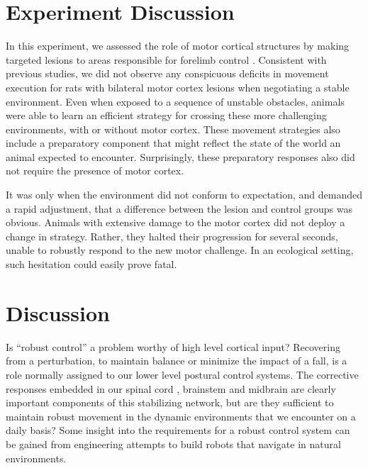 \section{Experiment Discussion}

In this experiment, we assessed the role of motor cortical structures by making targeted lesions to areas responsible for forelimb control \cite{Kawai2015,Otchy2015}. Consistent with previous studies, we did not observe any conspicuous deficits in movement execution for rats with bilateral motor cortex lesions when negotiating a stable environment. Even when exposed to a sequence of unstable obstacles, animals were able to learn an efficient strategy for crossing these more challenging environments, with or without motor cortex. These movement strategies also include a preparatory component that might reflect the state of the world an animal expected to encounter. Surprisingly, these preparatory responses also did not require the presence of motor cortex.

It was only when the environment did not conform to expectation, and demanded a rapid adjustment, that a difference between the lesion and control groups was obvious. Animals with extensive damage to the motor cortex did not deploy a change in strategy. Rather, they halted their progression for several seconds, unable to robustly respond to the new motor challenge. In an ecological setting, such hesitation could easily prove fatal.

\section{Discussion}

Is ``robust control'' a problem worthy of high level cortical input? Recovering from a perturbation, to maintain balance or minimize the impact of a fall, is a role normally assigned to our lower level postural control systems. The corrective responses embedded in our spinal cord \cite{Sherrington1893b,Sherrington1910}, brainstem \cite{Arshian2014} and midbrain \cite{Grillner1973} are clearly important components of this stabilizing network, but are they sufficient to maintain robust movement in the dynamic environments that we encounter on a daily basis? Some insight into the requirements for a robust control system can be gained from engineering attempts to build robots that navigate in natural environments.

